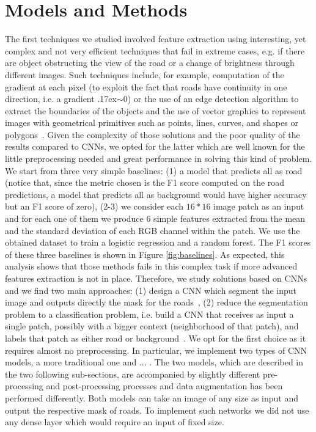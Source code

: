 \documentclass[10pt,conference,compsocconf]{IEEEtran}
\begin{document}
\section{Models and Methods}
\label{sec:models-methods}
The first techniques we studied involved feature extraction using interesting, yet complex and not very efficient techniques that fail in extreme cases, e.g. if there are object obstructing the view of the road or a change of brightness through different images. Such techniques include, for example, computation of the gradient at each pixel (to exploit the fact that roads have continuity in one direction, i.e. a gradient {\raise.17ex\hbox{$\scriptstyle\sim$}}0) or the use of an edge detection algorithm to extract the boundaries of the objects and the use of vector graphics to represent images with geometrical primitives such as points, lines, curves, and shapes or polygons~\cite{HORMESE20161460}. Given the complexity of those solutions and the poor quality of the results compared to CNNs, we opted for the latter which are well known for the little preprocessing needed and great performance in solving this kind of problem.
We start from three very simple baselines: (1) a model that predicts all as road (notice that, since the metric chosen is the F1 score computed on the road predictions, a model that predicts all as background would have higher accuracy but an F1 score of zero), (2-3) we consider each $16*16$ image patch as an input and for each one of them we produce 6 simple features extracted from the mean and the standard deviation of each RGB channel within the patch. We use the obtained dataset to train a logistic regression and a random forest. The F1 scores of these three baselines is shown in Figure \ref{fig:baselines}. As expected, this analysis shows that those methods fails in this complex task if more advanced features extraction is not in place.
Therefore, we study solutions based on CNNs and we find two main approaches: (1) design a CNN which segment the input image and outputs directly the mask for the roads~\cite{lis2016}, (2) reduce the segmentation problem to a classification problem, i.e. build a CNN that receives as input a single patch, possibly with a bigger context (neighborhood of that patch), and labels that patch as either road or background~\cite{dario2016}. We opt for the first choice as it requires almost no preprocessing. In particular, we implement two types of CNN models, a more traditional one and ... . The two models, which are described in the two following sub-sections, are accompanied by slightly different pre-processing and post-processing processes and data augmentation has been performed differently. Both models can take an image of any size as input  and output the respective mask of roads. To implement such networks we did not use any dense layer which would require an input of fixed size. 
\end{document}
